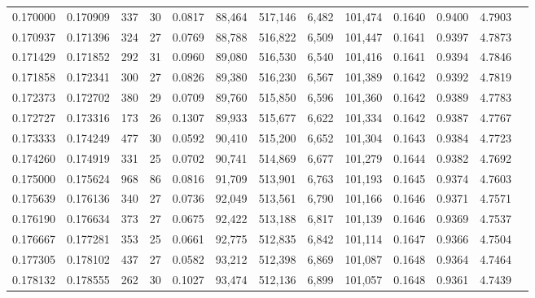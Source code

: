 \begin{tabular}{rrrrrrrrrrrrr}
0.170000 & 0.170909 &    337 &    30 &                                     0.0817 &  88,464 & 517,146 &   6,482 & 101,474 & 0.1640 & 0.9400 & 4.7903 \\
0.170937 & 0.171396 &    324 &    27 &                                     0.0769 &  88,788 & 516,822 &   6,509 & 101,447 & 0.1641 & 0.9397 & 4.7873 \\
0.171429 & 0.171852 &    292 &    31 &                                     0.0960 &  89,080 & 516,530 &   6,540 & 101,416 & 0.1641 & 0.9394 & 4.7846 \\
0.171858 & 0.172341 &    300 &    27 &                                     0.0826 &  89,380 & 516,230 &   6,567 & 101,389 & 0.1642 & 0.9392 & 4.7819 \\
0.172373 & 0.172702 &    380 &    29 &                                     0.0709 &  89,760 & 515,850 &   6,596 & 101,360 & 0.1642 & 0.9389 & 4.7783 \\
0.172727 & 0.173316 &    173 &    26 &                                     0.1307 &  89,933 & 515,677 &   6,622 & 101,334 & 0.1642 & 0.9387 & 4.7767 \\
0.173333 & 0.174249 &    477 &    30 &                                     0.0592 &  90,410 & 515,200 &   6,652 & 101,304 & 0.1643 & 0.9384 & 4.7723 \\
0.174260 & 0.174919 &    331 &    25 &                                     0.0702 &  90,741 & 514,869 &   6,677 & 101,279 & 0.1644 & 0.9382 & 4.7692 \\
0.175000 & 0.175624 &    968 &    86 &                                     0.0816 &  91,709 & 513,901 &   6,763 & 101,193 & 0.1645 & 0.9374 & 4.7603 \\
0.175639 & 0.176136 &    340 &    27 &                                     0.0736 &  92,049 & 513,561 &   6,790 & 101,166 & 0.1646 & 0.9371 & 4.7571 \\
0.176190 & 0.176634 &    373 &    27 &                                     0.0675 &  92,422 & 513,188 &   6,817 & 101,139 & 0.1646 & 0.9369 & 4.7537 \\
0.176667 & 0.177281 &    353 &    25 &                                     0.0661 &  92,775 & 512,835 &   6,842 & 101,114 & 0.1647 & 0.9366 & 4.7504 \\
0.177305 & 0.178102 &    437 &    27 &                                     0.0582 &  93,212 & 512,398 &   6,869 & 101,087 & 0.1648 & 0.9364 & 4.7464 \\
0.178132 & 0.178555 &    262 &    30 &                                     0.1027 &  93,474 & 512,136 &   6,899 & 101,057 & 0.1648 & 0.9361 & 4.7439 \\

\end{tabular}
